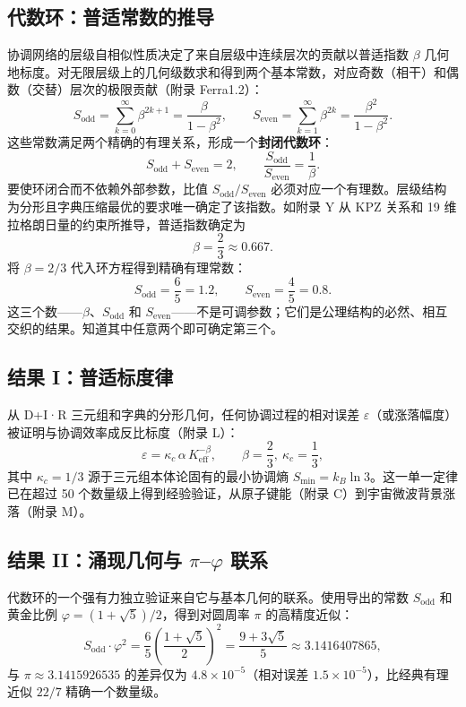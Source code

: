 \documentclass[11pt,a4paper]{article}
\begin{document}
	\subsection{代数环：普适常数的推导}
	\label{subsec:algebraic-loop}
	
	协调网络的层级自相似性质决定了来自层级中连续层次的贡献以普适指数 $\beta$ 几何地标度。对无限层级上的几何级数求和得到两个基本常数，对应奇数（相干）和偶数（交替）层次的极限贡献（附录 Ferra1.2）：
	\[
	S_{\mathrm{odd}} = \sum_{k=0}^{\infty} \beta^{2k+1} = \frac{\beta}{1-\beta^{2}}, \qquad
	S_{\mathrm{even}} = \sum_{k=1}^{\infty} \beta^{2k} = \frac{\beta^{2}}{1-\beta^{2}}.
	\]
	这些常数满足两个精确的有理关系，形成一个\textbf{封闭代数环}：
	\[
	\boxed{S_{\mathrm{odd}} + S_{\mathrm{even}} = 2, \qquad \frac{S_{\mathrm{odd}}}{S_{\mathrm{even}}} = \frac{1}{\beta}}.
	\]
	要使环闭合而不依赖外部参数，比值 $S_{\mathrm{odd}}/S_{\mathrm{even}}$ 必须对应一个有理数。层级结构为分形且字典压缩最优的要求唯一确定了该指数。如附录 Y 从 KPZ 关系和 19 维拉格朗日量的约束所推导，普适指数确定为
	\[
	\beta = \frac{2}{3} \approx 0.667.
	\]
	将 $\beta = 2/3$ 代入环方程得到精确有理常数：
	\[
	S_{\mathrm{odd}} = \frac{6}{5} = 1.2,\qquad S_{\mathrm{even}} = \frac{4}{5} = 0.8.
	\]
	这三个数——$\beta$、$S_{\mathrm{odd}}$ 和 $S_{\mathrm{even}}$——不是可调参数；它们是公理结构的必然、相互交织的结果。知道其中任意两个即可确定第三个。
	
	\subsection{结果 I：普适标度律}
	\label{subsec:consequence-scaling}
	
	从 D+I·R 三元组和字典的分形几何，任何协调过程的相对误差 $\varepsilon$（或涨落幅度）被证明与协调效率成反比标度（附录 L）：
	\[
	\boxed{\varepsilon = \kappa_c \, \alpha \, K_{\mathrm{eff}}^{-\beta}, \qquad \beta = \frac{2}{3},\ \kappa_c = \frac{1}{3}},
	\]
	其中 $\kappa_c = 1/3$ 源于三元组本体论固有的最小协调熵 $S_{\min} = k_B \ln 3$。这一单一定律已在超过 50 个数量级上得到经验验证，从原子键能（附录 C）到宇宙微波背景涨落（附录 M）。
	
	\subsection{结果 II：涌现几何与 $\pi$–$\varphi$ 联系}
	\label{subsec:consequence-geometry}
	
	代数环的一个强有力独立验证来自它与基本几何的联系。使用导出的常数 $S_{\mathrm{odd}}$ 和黄金比例 $\varphi = (1+\sqrt{5})/2$，得到对圆周率 $\pi$ 的高精度近似：
	\[
	S_{\mathrm{odd}} \cdot \varphi^2 = \frac{6}{5} \left( \frac{1+\sqrt{5}}{2} \right)^2 = \frac{9+3\sqrt{5}}{5} \approx 3.1416407865,
	\]
	与 $\pi \approx 3.1415926535$ 的差异仅为 $4.8 \times 10^{-5}$（相对误差 $1.5 \times 10^{-5}$），比经典有理近似 $22/7$ 精确一个数量级。
	
\end{document}

